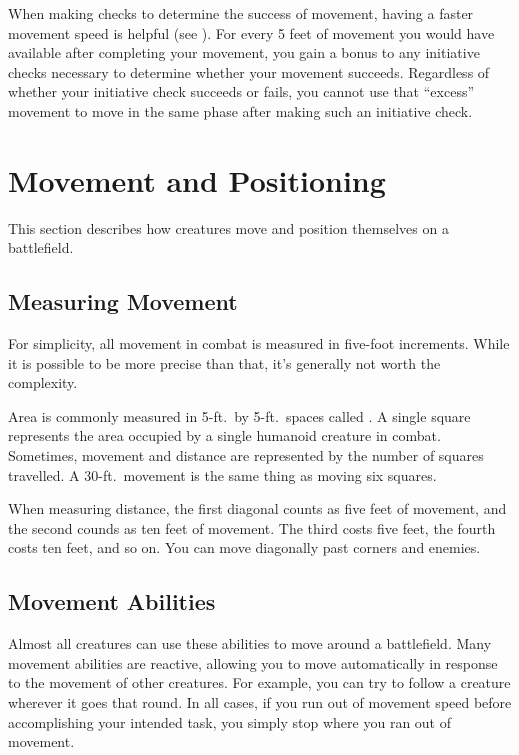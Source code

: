         \label{Movement-Based Initiative}
        When making  checks to determine the success of movement, having a faster movement speed is helpful (see ).
        For every 5 feet of movement you would have available after completing your movement, you gain a  bonus to any initiative checks necessary to determine whether your movement succeeds.
        Regardless of whether your initiative check succeeds or fails, you cannot use that ``excess'' movement to move in the same phase after making such an initiative check.

\section{Movement and Positioning}\label{Movement and Positioning}
    This section describes how creatures move and position themselves on a battlefield.

    \subsection{Measuring Movement}

        For simplicity, all movement in combat is measured in five-foot increments.
        While it is possible to be more precise than that, it's generally not worth the complexity.

        \label{Squares} Area is commonly measured in 5-ft.\ by 5-ft.\ spaces called .
        A single square represents the area occupied by a single humanoid creature in combat.
        Sometimes, movement and distance are represented by the number of squares travelled.
        A 30-ft.\ movement is the same thing as moving six squares.

        \label{Diagonals} When measuring distance, the first diagonal counts as five feet of movement, and the second counds as ten feet of movement.
        The third costs five feet, the fourth costs ten feet, and so on.
        You can move diagonally past corners and enemies.

    \subsection{Movement Abilities}\label{Movement Abilities}

        Almost all creatures can use these abilities to move around a battlefield.
        Many movement abilities are reactive, allowing you to move automatically in response to the movement of other creatures.
        For example, you can try to follow a creature wherever it goes that round.
        In all cases, if you run out of movement speed before accomplishing your intended task, you simply stop where you ran out of movement.

